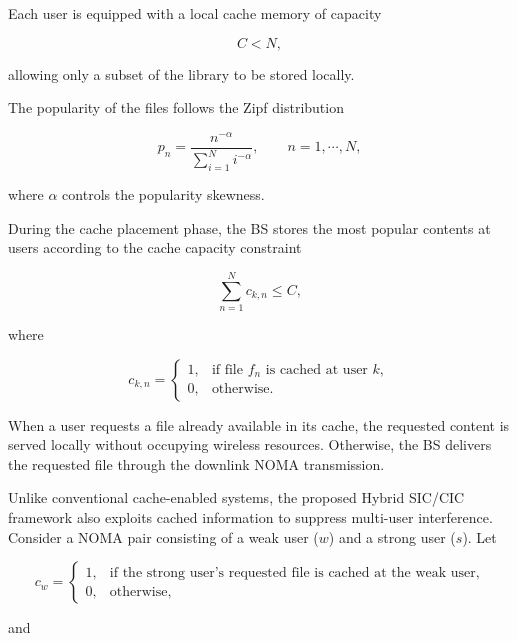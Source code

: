 \documentclass[conference]{IEEEtran}
\begin{document}
Each user is equipped with a local cache memory of capacity

\begin{equation}
C<N,
\end{equation}

allowing only a subset of the library to be stored locally.

The popularity of the files follows the Zipf distribution

\begin{equation}
p_n=
\frac{n^{-\alpha}}
{\sum_{i=1}^{N}i^{-\alpha}},
\qquad
n=1,\cdots,N,
\label{eq:zipf_distribution}
\end{equation}

where $\alpha$ controls the popularity skewness.

During the cache placement phase, the BS stores the most popular contents at users according to the cache capacity constraint

\begin{equation}
\sum_{n=1}^{N}c_{k,n}\le C,
\label{eq:cache_constraint}
\end{equation}

where

\begin{equation}
c_{k,n}
=
\begin{cases}
1, & \text{if file }f_n\text{ is cached at user }k,\\
0, & \text{otherwise}.
\end{cases}
\label{eq:cache_indicator}
\end{equation}

When a user requests a file already available in its cache, the requested content is served locally without occupying wireless resources. Otherwise, the BS delivers the requested file through the downlink NOMA transmission.

Unlike conventional cache-enabled systems, the proposed Hybrid SIC/CIC framework also exploits cached information to suppress multi-user interference. Consider a NOMA pair consisting of a weak user ($w$) and a strong user ($s$). Let

\begin{equation}
c_w=
\begin{cases}
1,& \text{if the strong user's requested file is cached at the weak user},\\
0,& \text{otherwise},
\end{cases}
\end{equation}

and
\end{document}
